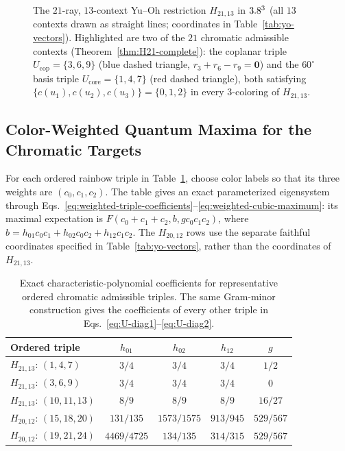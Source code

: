 \documentclass[aps,pra,reprint,superscriptaddress,longbibliography,nofootinbib,floatfix,10pt]{revtex4-2}
\theoremstyle{definition}\newtheorem{definition}[theorem]{Definition}
\theoremstyle{remark}\newtheorem{remark}[theorem]{Remark}
\begin{document}
\begin{figure}[!htbp]
\caption{The $21$-ray, $13$-context Yu--Oh restriction $H_{21,13}$ in $3.8^3$ (all $13$ contexts drawn as straight lines; coordinates in Table~\ref{tab:yo-vectors}). Highlighted are two of the $21$ chromatic admissible contexts (Theorem~\ref{thm:H21-complete}): the coplanar triple $U_{\mathrm{cop}}=\{3,6,9\}$ (blue dashed triangle, $r_3+r_6-r_9=\mathbf{0}$) and the $60^\circ$ basis triple $U_{\mathrm{core}}=\{1,4,7\}$ (red dashed triangle), both satisfying $\{c(u_1),c(u_2),c(u_3)\}=\{0,1,2\}$ in every $3$-coloring of $H_{21,13}$.}\label{fig:H21-admissibility}
\end{figure}

\subsection{Color-Weighted Quantum Maxima for the Chromatic Targets}\label{sec:weighted-YO}

For each ordered rainbow triple in Table~\ref{tab:weighted-YO}, choose color labels so that its three weights are $(c_0,c_1,c_2)$. The table gives an exact parameterized eigensystem through Eqs.~\eqref{eq:weighted-triple-coefficients}--\eqref{eq:weighted-cubic-maximum}: its maximal expectation is $F(c_0+c_1+c_2,b,gc_0c_1c_2)$, where $b=h_{01}c_0c_1+h_{02}c_0c_2+h_{12}c_1c_2$. The $H_{20,12}$ rows use the separate faithful coordinates specified in Table~\ref{tab:yo-vectors}, rather than the coordinates of $H_{21,13}$.

\begin{table}[t]
\caption{Exact characteristic-polynomial coefficients for representative ordered chromatic admissible triples. The same Gram-minor construction gives the coefficients of every other triple in Eqs.~\eqref{eq:U-diag1}--\eqref{eq:U-diag2}.}\label{tab:weighted-YO}
\footnotesize\setlength{\tabcolsep}{3pt}
\begin{ruledtabular}
\begin{tabular}{lcccc}
Ordered triple & $h_{01}$ & $h_{02}$ & $h_{12}$ & $g$\\\hline
$H_{21,13}$: $(1,4,7)$ & $3/4$ & $3/4$ & $3/4$ & $1/2$\\
$H_{21,13}$: $(3,6,9)$ & $3/4$ & $3/4$ & $3/4$ & $0$\\
$H_{21,13}$: $(10,11,13)$ & $8/9$ & $8/9$ & $8/9$ & $16/27$\\
$H_{20,12}$: $(15,18,20)$ & $131/135$ & $1573/1575$ & $913/945$ & $529/567$\\
$H_{20,12}$: $(19,21,24)$ & $4469/4725$ & $134/135$ & $314/315$ & $529/567$
\end{tabular}
\end{ruledtabular}
\end{table}
\end{document}

